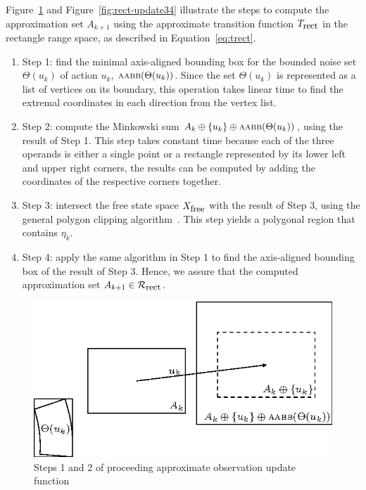 Figure~\ref{fig:rect-update12} and Figure~\ref{fig:rect-update34} illustrate the steps to
compute the approximation set $A_{k+1}$ using the approximate transition function $T_{\mbox{\small rect}}$ in the rectangle range space, as described in Equation~\ref{eq:trect}.

\begin{enumerate}
\item Step 1: find the minimal axis-aligned bounding box for the bounded noise set
  $\Theta(u_k)$ of action $u_k$, $\textsc{aabb}(\Theta(u_k))$. 
  Since the set $\Theta(u_k)$ is represented as a list of vertices on its boundary, this
  operation takes linear time to find the extremal coordinates in each direction
  from the vertex list.

\item Step 2: compute the Minkowski sum $A_k \oplus \{ u_k \} \oplus \textsc{aabb}(\Theta(u_k))$, 
  using the result of Step 1. 
  This step takes constant time because each of the three operands is either a single point or a rectangle
  represented by its lower left and upper right corners, the results can be
  computed by adding the coordinates of the respective corners together.
	
\item Step 3: intersect the free state space $X_{\mbox{\small free}}$ with the result of Step
  3, using the general polygon clipping algorithm~\cite{Vat92}. 
  This step yields a polygonal region that contains $\eta_k$.

\item Step 4: apply the same algorithm in Step 1 to find the axis-aligned
  bounding box of the result of Step 3. 
  Hence, we assure that the computed approximation set $A_{k+1} \in \mathcal{R}_{\mbox{\small rect}}$.
\end{enumerate}
\begin{figure}
\centering
  \includegraphics[scale=1.2]{figs/rect-update2}  
  \caption{Steps 1 and 2 of proceeding approximate observation update function}
  \label{fig:rect-update12}
\end{figure}

